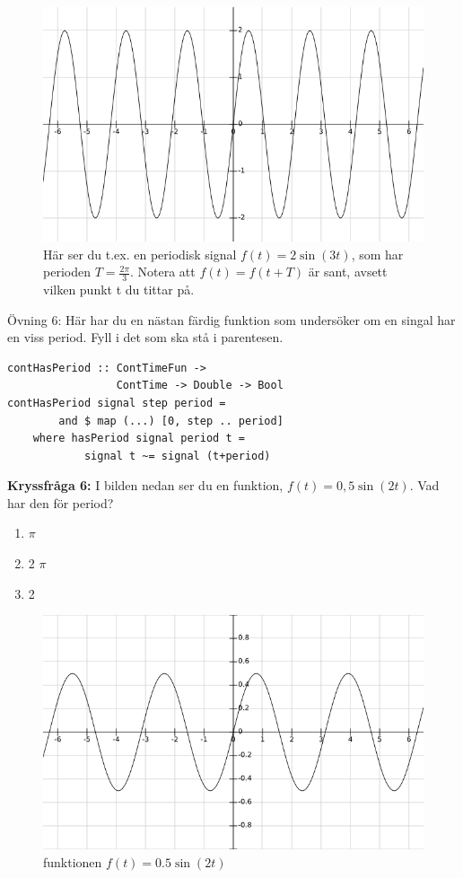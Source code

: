 \documentclass{article}
\begin{document}
\begin{figure}[ht]
\centerline{\includegraphics[scale=0.55]{image12.png}}
\caption{Här ser du t.ex. en periodisk signal $f(t)=2 \sin(3 t)$, som har perioden $T=\frac{2\pi}{3}$. Notera att $f(t)=f(t+T)$ är sant, avsett vilken punkt t du tittar på.}
\label{}
\end{figure}
\newpage
Övning 6: Här har du en nästan färdig funktion som undersöker om en singal har en viss period. Fyll i det som ska stå i parentesen.
\begin{verbatim}
contHasPeriod :: ContTimeFun ->
                 ContTime -> Double -> Bool
contHasPeriod signal step period =
        and $ map (...) [0, step .. period]
    where hasPeriod signal period t =
            signal t ~= signal (t+period)
\end{verbatim}

\textbf{Kryssfråga 6:} I bilden nedan ser du en funktion, $f(t)=0,5\sin(2t)$. Vad har den för period?
\begin{enumerate}[label={\alph*)},font={\bfseries}]
    \item $\pi$
    \item 2 $\pi$
    \item 2
\end{enumerate}

\begin{figure}[ht]
\centerline{\includegraphics[scale=0.50]{image08.png}}
\caption{funktionen $f(t) = 0.5 \sin(2t)$}
\label{}
\end{figure}
\end{document}
